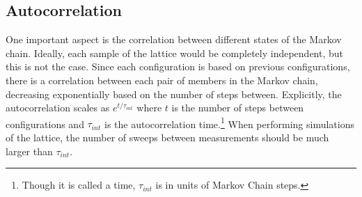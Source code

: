 \documentclass[12pt]{report}
\begin{document}
\subsection{Autocorrelation}
One important aspect is the correlation between different states of the Markov chain. Ideally, each sample of the lattice would be completely independent, but this is not the case. Since each configuration is based on previous configurations, there is a correlation between each pair of members in the Markov chain, decreasing exponentially based on the number of steps between. Explicitly, the autocorrelation scales as $e^{t/\tau_{int}}$ where $t$ is the number of steps between configurations and $\tau_{int}$ is the autocorrelation time.\footnote{Though it is called a time, $\tau_{int}$ is in units of Markov Chain steps.} When performing simulations of the lattice, the number of sweeps between measurements should be much larger than $\tau_{int}$. 
\end{document}
